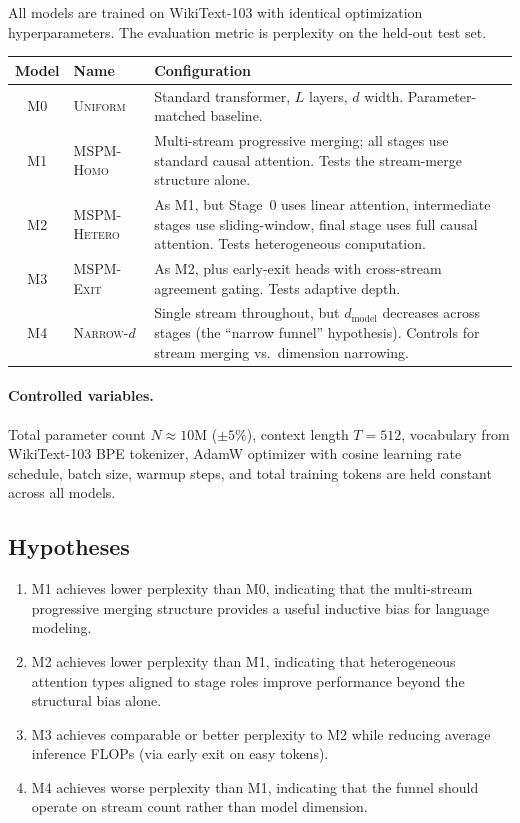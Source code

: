 \documentclass[11pt,a4paper]{article}
\theoremstyle{definition}
\theoremstyle{plain}
\theoremstyle{remark}
\begin{document}
All models are trained on WikiText-103 \cite{merity2017pointer} with 
identical optimization hyperparameters. The evaluation metric is 
perplexity on the held-out test set.

\begin{center}
\renewcommand{\arraystretch}{1.3}
\begin{tabular}{@{}clp{8cm}@{}}
\toprule
\textbf{Model} & \textbf{Name} & \textbf{Configuration} \\
\midrule
M0 & \textsc{Uniform} & Standard transformer, $L$ layers, $d$ width. 
  Parameter-matched baseline. \\
M1 & \textsc{MSPM-Homo} & Multi-stream progressive merging; all stages 
  use standard causal attention. Tests the stream-merge structure alone. \\
M2 & \textsc{MSPM-Hetero} & As M1, but Stage~0 uses linear attention, 
  intermediate stages use sliding-window, final stage uses full causal 
  attention. Tests heterogeneous computation. \\
M3 & \textsc{MSPM-Exit} & As M2, plus early-exit heads with 
  cross-stream agreement gating. Tests adaptive depth. \\
M4 & \textsc{Narrow-$d$} & Single stream throughout, but $d_{\text{model}}$ 
  decreases across stages (the ``narrow funnel'' hypothesis). Controls 
  for stream merging vs.\ dimension narrowing. \\
\bottomrule
\end{tabular}
\end{center}

\paragraph{Controlled variables.}
Total parameter count $N \approx 10\text{M}$ ($\pm 5\%$), context length 
$T = 512$, vocabulary from WikiText-103 BPE tokenizer, AdamW optimizer 
with cosine learning rate schedule, batch size, warmup steps, and total 
training tokens are held constant across all models.

\subsection{Hypotheses}

\begin{enumerate}[label=\textbf{H\arabic*.}, leftmargin=2.5em]
  \item M1 achieves lower perplexity than M0, indicating that the 
    multi-stream progressive merging structure provides a useful inductive 
    bias for language modeling.
  \item M2 achieves lower perplexity than M1, indicating that 
    heterogeneous attention types aligned to stage roles improve 
    performance beyond the structural bias alone.
  \item M3 achieves comparable or better perplexity to M2 while reducing 
    average inference FLOPs (via early exit on easy tokens).
  \item M4 achieves worse perplexity than M1, indicating that the funnel 
    should operate on stream count rather than model dimension.
\end{enumerate}
\end{document}
